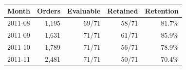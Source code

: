 \begin{tabular}{lrrrr}
\toprule
Month & Orders & Evaluable & Retained & Retention \\
\midrule
2011-08 & 1,195 & 69/71 & 58/71 & 81.7\% \\
2011-09 & 1,631 & 71/71 & 61/71 & 85.9\% \\
2011-10 & 1,789 & 71/71 & 56/71 & 78.9\% \\
2011-11 & 2,481 & 71/71 & 50/71 & 70.4\% \\
\bottomrule
\end{tabular}
